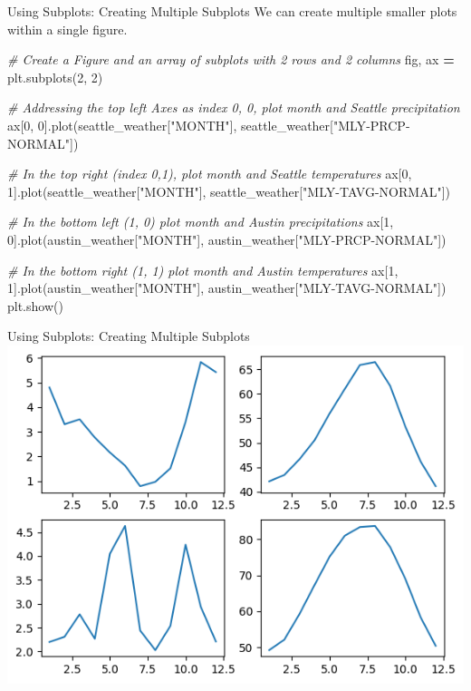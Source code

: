 \documentclass[
  ignorenonframetext,
]{beamer}
\newenvironment{Shaded}{\begin{snugshade}}{\end{snugshade}}
\newcommand{\CommentTok}[1]{\textcolor[rgb]{0.56,0.35,0.01}{\textit{#1}}}
\newcommand{\DecValTok}[1]{\textcolor[rgb]{0.00,0.00,0.81}{#1}}
\newcommand{\NormalTok}[1]{#1}
\newcommand{\OperatorTok}[1]{\textcolor[rgb]{0.81,0.36,0.00}{\textbf{#1}}}
\newcommand{\StringTok}[1]{\textcolor[rgb]{0.31,0.60,0.02}{#1}}
\begin{document}
\begin{frame}[fragile]{Using Subplots: Creating Multiple Subplots}
\label{using-subplots-creating-multiple-subplots}
We can create multiple smaller plots within a single figure.


\begin{Shaded}
\begin{Highlighting}[]
\CommentTok{\# Create a Figure and an array of subplots with 2 rows and 2 columns}
\NormalTok{fig, ax }\OperatorTok{=}\NormalTok{ plt.subplots(}\DecValTok{2}\NormalTok{, }\DecValTok{2}\NormalTok{)}

\CommentTok{\# Addressing the top left Axes as index 0, 0, plot month and Seattle precipitation}
\NormalTok{ax[}\DecValTok{0}\NormalTok{, }\DecValTok{0}\NormalTok{].plot(seattle\_weather[}\StringTok{"MONTH"}\NormalTok{], seattle\_weather[}\StringTok{"MLY{-}PRCP{-}NORMAL"}\NormalTok{])}

\CommentTok{\# In the top right (index 0,1), plot month and Seattle temperatures}
\NormalTok{ax[}\DecValTok{0}\NormalTok{, }\DecValTok{1}\NormalTok{].plot(seattle\_weather[}\StringTok{"MONTH"}\NormalTok{], seattle\_weather[}\StringTok{"MLY{-}TAVG{-}NORMAL"}\NormalTok{])}

\CommentTok{\# In the bottom left (1, 0) plot month and Austin precipitations}
\NormalTok{ax[}\DecValTok{1}\NormalTok{, }\DecValTok{0}\NormalTok{].plot(austin\_weather[}\StringTok{"MONTH"}\NormalTok{], austin\_weather[}\StringTok{"MLY{-}PRCP{-}NORMAL"}\NormalTok{])}

\CommentTok{\# In the bottom right (1, 1) plot month and Austin temperatures}
\NormalTok{ax[}\DecValTok{1}\NormalTok{, }\DecValTok{1}\NormalTok{].plot(austin\_weather[}\StringTok{"MONTH"}\NormalTok{], austin\_weather[}\StringTok{"MLY{-}TAVG{-}NORMAL"}\NormalTok{])}
\NormalTok{plt.show()}
\end{Highlighting}
\end{Shaded}
\end{frame}

\begin{frame}{Using Subplots: Creating Multiple Subplots}
\label{using-subplots-creating-multiple-subplots-1}
\includegraphics{../images/im231.png}
\end{frame}
\end{document}
